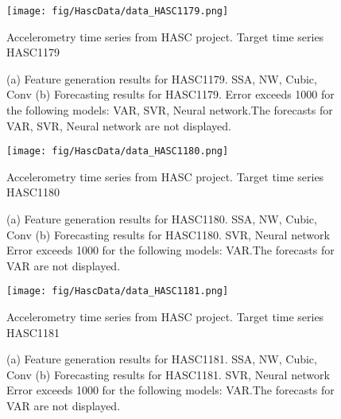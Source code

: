 \documentclass[12pt]{article}
\begin{document}
\begin{figure}
\centering
\texttt{[image: fig/HascData/data\_HASC1179.png]}
\caption{Accelerometry time series from HASC project. Target time series	HASC1179	}
\end{figure}


\begin{figure}
\centering
{}
\caption{(a)	Feature generation results for	HASC1179.	SSA, NW, Cubic, Conv	(b)	Forecasting results for	HASC1179.		Error exceeds 1000 for the following models: VAR, SVR, Neural network.The forecasts for VAR, SVR, Neural network are not displayed.	}
\end{figure}


\begin{figure}
\centering
\texttt{[image: fig/HascData/data\_HASC1180.png]}
\caption{Accelerometry time series from HASC project. Target time series	HASC1180	}
\end{figure}


\begin{figure}
\centering
{}
\caption{(a)	Feature generation results for	HASC1180.	SSA, NW, Cubic, Conv	(b)	Forecasting results for	HASC1180.	SVR, Neural network	Error exceeds 1000 for the following models: VAR.The forecasts for VAR are not displayed.	}
\end{figure}


\begin{figure}
\centering
\texttt{[image: fig/HascData/data\_HASC1181.png]}
\caption{Accelerometry time series from HASC project. Target time series	HASC1181	}
\end{figure}


\begin{figure}
\centering
{}
\caption{(a)	Feature generation results for	HASC1181.	SSA, NW, Cubic, Conv	(b)	Forecasting results for	HASC1181.	SVR, Neural network	Error exceeds 1000 for the following models: VAR.The forecasts for VAR are not displayed.	}
\end{figure}
\end{document}
